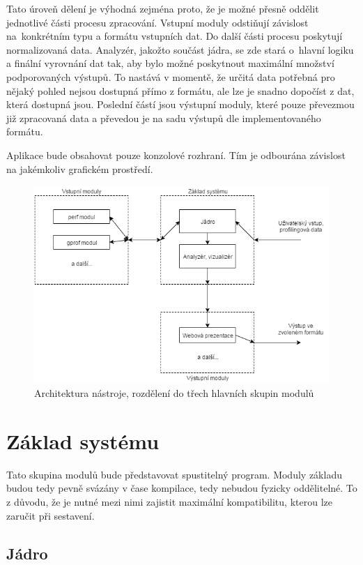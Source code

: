 \documentclass[czech,BP]{thesiskiv}
\begin{document}
Tato úroveň dělení je výhodná zejména proto, že je možné přesně oddělit jednotlivé části procesu zpracování. Vstupní moduly odstiňují závislost na~konkrétním typu a formátu vstupních dat. Do další části procesu poskytují normalizovaná data. Analyzér, jakožto součást jádra, se zde stará o~hlavní logiku a finální vyrovnání dat tak, aby bylo možné poskytnout maximální množství podporovaných výstupů. To nastává v momentě, že určitá data potřebná pro nějaký pohled nejsou dostupná přímo z formátu, ale lze je snadno dopočíst z dat, která dostupná jsou. Poslední částí jsou výstupní moduly, které pouze převezmou již zpracovaná data a převedou je na sadu výstupů dle implementovaného formátu.

Aplikace bude obsahovat pouze konzolové rozhraní. Tím je odbourána závislost na jakémkoliv grafickém prostředí.

\begin{figure}[h]
    \centering
    \includegraphics[interpolate,width=1.0\textwidth]{img/system_diagr.png}
    \caption{Architektura nástroje, rozdělení do třech hlavních skupin modulů}
    \label{obr:systemmodules}
\end{figure}

\section{Základ systému}

Tato skupina modulů bude představovat spustitelný program. Moduly základu budou tedy pevně svázány v čase kompilace, tedy nebudou fyzicky oddělitelné. To z důvodu, že je nutné mezi nimi zajistit maximální kompatibilitu, kterou lze zaručit při sestavení.

\subsection{Jádro}
\end{document}
